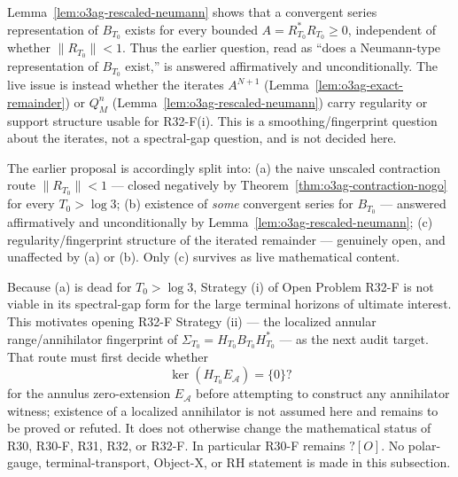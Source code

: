 \begin{remark}
Lemma~\ref{lem:o3ag-rescaled-neumann} shows that a convergent series representation of
\(B_{T_0}\) exists for every bounded \(A=R_{T_0}^*R_{T_0}\ge0\), independent of whether
\(\|R_{T_0}\|<1\).  Thus the earlier question, read as ``does a Neumann-type
representation of \(B_{T_0}\) exist,'' is answered affirmatively and unconditionally.
The live issue is instead whether the iterates \(A^{N+1}\)
(Lemma~\ref{lem:o3ag-exact-remainder}) or \(Q_M^n\)
(Lemma~\ref{lem:o3ag-rescaled-neumann}) carry regularity or support structure usable for
R32-F(i).  This is a smoothing/fingerprint question about the iterates, not a
spectral-gap question, and is not decided here.
\end{remark}

\begin{remark}
\label{rem:o3ag-r34c-split}
The earlier proposal is accordingly split into: (a) the naive unscaled contraction
route \(\|R_{T_0}\|<1\) --- closed negatively by
Theorem~\ref{thm:o3ag-contraction-nogo} for every \(T_0>\log3\); (b) existence of
\emph{some} convergent series for \(B_{T_0}\) --- answered affirmatively and
unconditionally by Lemma~\ref{lem:o3ag-rescaled-neumann}; (c) regularity/fingerprint
structure of the iterated remainder --- genuinely open, and unaffected by (a) or (b).
Only (c) survives as live mathematical content.
\end{remark}

\begin{remark}
\label{rem:o3ag-routemap}
Because (a) is dead for \(T_0>\log3\), Strategy (i) of Open Problem R32-F is not viable
in its spectral-gap form for the large terminal horizons of ultimate interest.  This
motivates opening R32-F Strategy (ii) --- the localized annular range/annihilator
fingerprint of \(\Sigma_{T_0}=H_{T_0}B_{T_0}H_{T_0}^*\) --- as the next audit target.
That route must first decide whether
\[
 \ker(H_{T_0}E_{\mathcal A})=\{0\}?
\]
for the annulus zero-extension \(E_{\mathcal A}\) before attempting to construct any
annihilator witness; existence of a localized annihilator is not assumed here and
remains to be proved or refuted.  It does not otherwise change the mathematical status
of R30, R30-F, R31, R32, or R32-F.  In particular R30-F remains \(?[O]\).  No
polar-gauge, terminal-transport, Object-X, or RH statement is made in this subsection.
\end{remark}